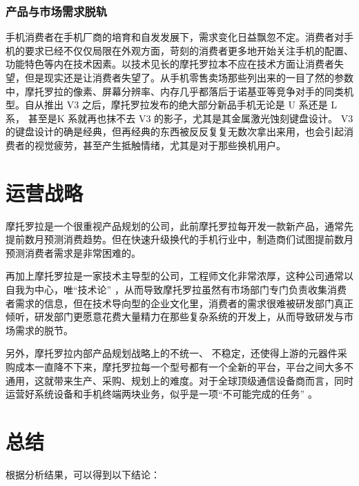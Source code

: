 \documentclass{ctexart}
\begin{document}
\subsubsection{产品与市场需求脱轨}%
\label{ssub:产品与市场需求脱轨}

手机消费者在手机厂商的培育和自发发展下，需求变化日益飘忽不定。消费者对手机的要求已经不仅仅局限在外观方面，苛刻的消费者更多地开始关注手机的配置、功能特色等内在技术因素。以技术见长的摩托罗拉本不应在技术方面让消费者失望，但是现实还是让消费者失望了。从手机零售卖场那些列出来的一目了然的参数中，摩托罗拉的像素、屏幕分辨率、内存几乎都落后于诺基亚等竞争对手的同类机型。自从推出 V3 之后，摩托罗拉发布的绝大部分新品手机无论是 U 系还是 L 系， 甚至是K 系就再也抹不去 V3 的影子，尤其是其金属激光蚀刻键盘设计。 V3 的键盘设计的确是经典，但再经典的东西被反反复复无数次拿出来用，也会引起消费者的视觉疲劳，甚至产生抵触情绪，尤其是对于那些换机用户。

\section{运营战略}%
\label{sec:运营战略}

摩托罗拉是一个很重视产品规划的公司，此前摩托罗拉每开发一款新产品，通常先提前数月预测消费趋势。但在快速升级换代的手机行业中，制造商们试图提前数月预测消费者需求是非常困难的。

再加上摩托罗拉是一家技术主导型的公司，工程师文化非常浓厚，这种公司通常以自我为中心，唯“技术论” ，从而导致摩托罗拉虽然有市场部门专门负责收集消费者需求的信息，但在技术导向型的企业文化里，消费者的需求很难被研发部门真正倾听，研发部门更愿意花费大量精力在那些复杂系统的开发上，从而导致研发与市场需求的脱节。

另外，摩托罗拉内部产品规划战略上的不统一、 不稳定，还使得上游的元器件采购成本一直降不下来，摩托罗拉每一个型号都有一个全新的平台，平台之间大多不通用，这就带来生产、采购、规划上的难度。对于全球顶级通信设备商而言，同时运营好系统设备和手机终端两块业务，似乎是一项“不可能完成的任务” 。

\section{总结}%
\label{sec:总结}

根据分析结果，可以得到以下结论：
\end{document}
